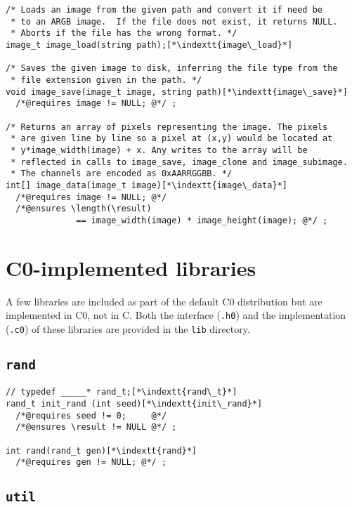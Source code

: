 \documentclass[11pt]{article}
\makeatletter
\newcommand{\indextt}[1]{\index{#1@\texttt{#1}}}
\makeatother
\begin{document}
\begin{lstlisting}
/* Loads an image from the given path and convert it if need be
 * to an ARGB image.  If the file does not exist, it returns NULL.
 * Aborts if the file has the wrong format. */
image_t image_load(string path);[*\indextt{image\_load}*]

/* Saves the given image to disk, inferring the file type from the
 * file extension given in the path. */
void image_save(image_t image, string path)[*\indextt{image\_save}*]
  /*@requires image != NULL; @*/ ;

/* Returns an array of pixels representing the image. The pixels
 * are given line by line so a pixel at (x,y) would be located at
 * y*image_width(image) + x. Any writes to the array will be
 * reflected in calls to image_save, image_clone and image_subimage.
 * The channels are encoded as 0xAARRGGBB. */
int[] image_data(image_t image)[*\indextt{image\_data}*]
  /*@requires image != NULL; @*/
  /*@ensures \length(\result)
              == image_width(image) * image_height(image); @*/ ;
\end{lstlisting}


\section{C0-implemented libraries}

A few libraries are included as part of the default C0 distribution
but are implemented in C0, not in C. Both the interface (\lstinline'.h0')
and the implementation (\lstinline'.c0') of these libraries are provided in
the \lstinline'lib' directory.

\subsection{\tt rand}

\begin{lstlisting}
// typedef _____* rand_t;[*\indextt{rand\_t}*]
rand_t init_rand (int seed)[*\indextt{init\_rand}*]
  /*@requires seed != 0;     @*/
  /*@ensures \result != NULL @*/ ;

int rand(rand_t gen)[*\indextt{rand}*]
  /*@requires gen != NULL; @*/ ;
\end{lstlisting}

\subsection{\tt util}
\end{document}
